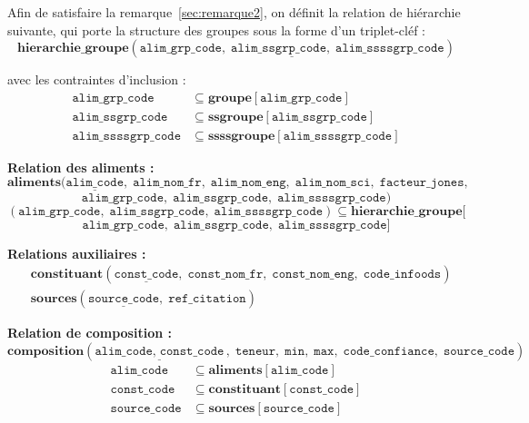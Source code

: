 \documentclass[12pt, a4paper]{article}
\newcommand{\attr}[1]{\texttt{#1}}
\begin{document}
    Afin de satisfaire la remarque~\ref{sec:remarque2}, on définit la relation de hiérarchie suivante,
    qui porte la structure des groupes sous la forme d'un triplet-cléf :
    \[
        \textbf{hierarchie\_groupe}(\underline{\attr{alim\_grp\_code},\; \attr{alim\_ssgrp\_code},\; \attr{alim\_ssssgrp\_code}})
    \]

    avec les contraintes d'inclusion :
    \begin{align*}
        \attr{alim\_grp\_code}     &\subseteq \textbf{groupe}[\attr{alim\_grp\_code}] \\
        \attr{alim\_ssgrp\_code}   &\subseteq \textbf{ssgroupe}[\attr{alim\_ssgrp\_code}] \\
        \attr{alim\_ssssgrp\_code} &\subseteq \textbf{ssssgroupe}[\attr{alim\_ssssgrp\_code}]
    \end{align*}

    \bigskip
    \noindent\textbf{Relation des aliments :}
    \[
        \textbf{aliments}(\underline{\attr{alim\_code}},\; \attr{alim\_nom\_fr},\; \attr{alim\_nom\_eng},\; \attr{alim\_nom\_sci},\; \attr{facteur\_jones},\;
    \]
    \[ \attr{alim\_grp\_code},\; \attr{alim\_ssgrp\_code},\; \attr{alim\_ssssgrp\_code})\]
    \[
        (\attr{alim\_grp\_code},\; \attr{alim\_ssgrp\_code},\; \attr{alim\_ssssgrp\_code}) \subseteq \textbf{hierarchie\_groupe}[
    \]
    \[\attr{alim\_grp\_code},\; \attr{alim\_ssgrp\_code},\; \attr{alim\_ssssgrp\_code}]\]

    \bigskip
    \noindent\textbf{Relations auxiliaires :}
    \begin{align*}
        &\textbf{constituant}(\underline{\attr{const\_code}},\; \attr{const\_nom\_fr},\; \attr{const\_nom\_eng},\; \attr{code\_infoods}) \\
        &\textbf{sources}(\underline{\attr{source\_code}},\; \attr{ref\_citation})
    \end{align*}

    \bigskip
    \noindent\textbf{Relation de composition :}
    \[
        \textbf{composition}(\underline{\attr{alim\_code},\; \attr{const\_code}},\; \attr{teneur},\; \attr{min},\; \attr{max},\; \attr{code\_confiance},\; \attr{source\_code})
    \]
    \begin{align*}
        \attr{alim\_code}   &\subseteq \textbf{aliments}[\attr{alim\_code}] \\
        \attr{const\_code}  &\subseteq \textbf{constituant}[\attr{const\_code}] \\
        \attr{source\_code} &\subseteq \textbf{sources}[\attr{source\_code}]
    \end{align*}
\end{document}
